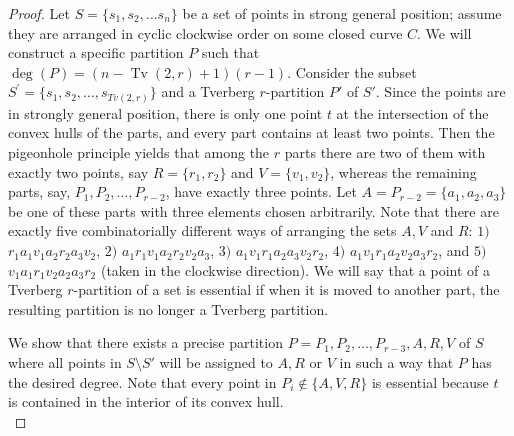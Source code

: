 \documentclass[11pt,a4paper]{article}
\theoremstyle{plain}
\theoremstyle{definition}
\newcommand{\tv}{\operatorname{Tv}}
\begin{document}
\begin{proof}
Let $S=\{s_1,s_2,\dots s_n\}$  be a set of points in strong general position; assume they are arranged in cyclic clockwise order on some closed curve $C$. 
We will construct a specific partition $P$ such that $\deg(P)=(n-\tv(2,r)+1)(r-1)$. 
Consider the subset $S^\prime=\{s_1,s_2,\dots ,s_{Tv(2,r)}\}$ and a Tverberg $r$-partition $P'$ of $S'$. Since the points are in strongly general position, there is only one point $t$ at the intersection of the convex hulls of the parts, and every part contains at least two points. Then the pigeonhole principle yields that among the $r$ parts there are two of them with exactly two points, say $R=\{r_1,r_2\}$ and $V=\{v_1,v_2\}$, whereas the remaining parts, say, $P_{1},P_{2},\dots,P_{r-2}$, have exactly three points. Let $A=P_{r-2}=\{a_1,a_2,a_3\}$ be one of these parts with three elements chosen arbitrarily. Note that there are exactly five combinatorially different ways of arranging the sets $A,V$ and $R$: $1)$ $r_1a_1v_1a_2r_2a_3v_2$, $2)$ $a_1r_1v_1a_2r_2v_2a_3$, $3)$ $a_1v_1r_1a_2a_3v_2r_2$, $4)$ $a_1v_ 1r_1a_2v_2a_3r_2$, and $5)$ $v_1a_1r_1v_2a_2a_3r_2$ (taken in the clockwise direction).
We will say that a point of a Tverberg $r$-partition of a set is essential if when it is moved to another part, the resulting partition is no longer a Tverberg partition. 

We show that there exists a precise partition $P= P_1, P_2,\dots,P_{r-3}, A,R,V $ of $S$ where all points  in $S\setminus S'$ will be assigned  to $A, R$ or $V$ in such a way that $P$ has the desired degree.    
Note that every point in $P_i\notin \{A,V,R\}$ is essential because $t$ is contained in the interior of its convex hull.\\



\end{proof}
\end{document}

